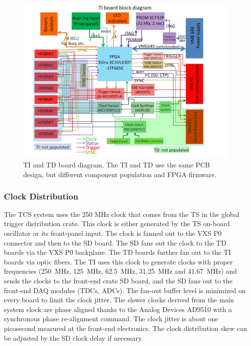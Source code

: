 \begin{figure}[hbt]
	\centering
	\includegraphics[width=1.0\columnwidth,keepaspectratio]{img/TIdiagram.jpg}
	\caption{TI and TD board diagram.  The TI and TD use the same PCB design, but different component population and FPGA firmware.}
	\label{fig:TIdiagram}
\end{figure}


\subsubsection{Clock Distribution}

The TCS system uses the 250 MHz clock that comes from the TS in the global trigger distribution crate.  This clock is either generated by the TS on-board oscillator or its front-panel input.  The clock is fanned out to the VXS P0 connector and then to the SD board.  The SD fans out the clock to the TD boards via the VXS P0 backplane.  The TD boards further fan out to the TI boards via optic fibers.  The TI uses this clock to generate clocks with proper frequencies (250~MHz, 125~MHz, 62.5~MHz, 31.25~MHz and 41.67~MHz) and sends the clocks to the front-end crate SD board, and the SD fans out to the front-end DAQ modules (TDCs, ADCs).  The fan-out buffer level is minimized on every board to limit the clock jitter.  The slower clocks derived from the main system clock are phase aligned thanks to the Analog Devices AD9510 with a synchronous phase re-alignment command.  The clock jitter is about one picosecond measured at the front-end electronics.  The clock distribution skew can be adjusted by the SD clock delay if necessary.


